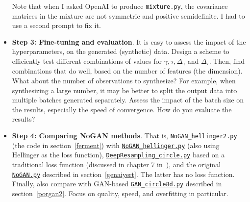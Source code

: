 \documentclass[oneside,10pt]{book}
\begin{document}
\begin{itemize}
Note that when I asked OpenAI to produce \texttt{mixture.py}, the   
\textcolor{index}{covariance matrices} in the mixture are not symmetric and 
\textcolor{index}{positive semidefinite}. I had to use a second prompt to fix it. 

\vspace{1ex}
\item[] {\bf Step 3: Fine-tuning and evaluation}.  It is easy to assess the impact of the hyperparameters, on the generated (synthetic) data. Design a scheme to efficiently test different combinations of values for $\gamma, \tau, \Delta_\gamma$ and $\Delta_\tau$.  Then, find combinations that do well, based on the number of features (the dimension). 
What about the number of observations to synthesize? For example, when synthesizing a large number, it may be better to split the output 
data into multiple batches generated separately. Assess the impact of the batch size on the results, especially the speed of convergence. How do you evaluate the results?
\vspace{1ex}
\item[] {\bf Step 4: Comparing NoGAN methods}.  That is, 
\href{https://github.com/VincentGranville/Main/blob/main/NoGAN_Hellinger2.py}{\texttt{NoGAN\_hellinger2.py}} (the code in section~\ref{ferment}) with
\href{https://github.com/VincentGranville/Main/blob/main/NoGAN_Hellinger.py}{\texttt{NoGAN\_hellinger.py}}  
(also using Hellinger as the loss function), 
\href{https://github.com/VincentGranville/Main/blob/main/DeepResampling_circle.py}{\texttt{DeepResampling\_circle.py}} 
based on a traditional loss function (discussed in chapter 7 in~\cite{vgmloptim}), 
and the original 
\href{https://github.com/VincentGranville/Main/blob/main/NoGAN.py}{\texttt{NoGAN.py}} 
described in section~\ref{genaiyert}. The latter has no loss function. Finally, also compare with 
GAN-based 
\href{https://github.com/VincentGranville/Main/blob/main/GAN\_circle8d.py}{\texttt{GAN\_circle8d.py}}
 described in section~\ref{porgan2}. 
Focus on quality, speed, and overfitting in particular.   
\end{itemize}
\vspace{1ex}
\end{document}
